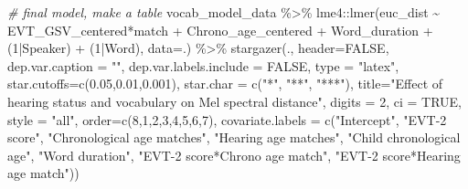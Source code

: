 \documentclass[
]{article}
\newenvironment{Shaded}{\begin{snugshade}}{\end{snugshade}}
\newcommand{\AttributeTok}[1]{\textcolor[rgb]{0.77,0.63,0.00}{#1}}
\newcommand{\CommentTok}[1]{\textcolor[rgb]{0.56,0.35,0.01}{\textit{#1}}}
\newcommand{\ConstantTok}[1]{\textcolor[rgb]{0.00,0.00,0.00}{#1}}
\newcommand{\DecValTok}[1]{\textcolor[rgb]{0.00,0.00,0.81}{#1}}
\newcommand{\FloatTok}[1]{\textcolor[rgb]{0.00,0.00,0.81}{#1}}
\newcommand{\FunctionTok}[1]{\textcolor[rgb]{0.00,0.00,0.00}{#1}}
\newcommand{\NormalTok}[1]{#1}
\newcommand{\SpecialCharTok}[1]{\textcolor[rgb]{0.00,0.00,0.00}{#1}}
\newcommand{\StringTok}[1]{\textcolor[rgb]{0.31,0.60,0.02}{#1}}
\begin{document}
\begin{Shaded}
\begin{Highlighting}[]
\CommentTok{\# final model, make a table}
\NormalTok{vocab\_model\_data }\SpecialCharTok{\%\textgreater{}\%}
\NormalTok{  lme4}\SpecialCharTok{::}\FunctionTok{lmer}\NormalTok{(euc\_dist }\SpecialCharTok{\textasciitilde{}}\NormalTok{ EVT\_GSV\_centered}\SpecialCharTok{*}\NormalTok{match }\SpecialCharTok{+}\NormalTok{ Chrono\_age\_centered }\SpecialCharTok{+}\NormalTok{ Word\_duration }\SpecialCharTok{+}\NormalTok{  (}\DecValTok{1}\SpecialCharTok{|}\NormalTok{Speaker) }\SpecialCharTok{+}\NormalTok{ (}\DecValTok{1}\SpecialCharTok{|}\NormalTok{Word), }\AttributeTok{data=}\NormalTok{.) }\SpecialCharTok{\%\textgreater{}\%}
  \FunctionTok{stargazer}\NormalTok{(., }\AttributeTok{header=}\ConstantTok{FALSE}\NormalTok{, }
            \AttributeTok{dep.var.caption =} \StringTok{""}\NormalTok{, }
            \AttributeTok{dep.var.labels.include =} \ConstantTok{FALSE}\NormalTok{,  }
            \AttributeTok{type =} \StringTok{"latex"}\NormalTok{,}
            \AttributeTok{star.cutoffs=}\FunctionTok{c}\NormalTok{(}\FloatTok{0.05}\NormalTok{,}\FloatTok{0.01}\NormalTok{,}\FloatTok{0.001}\NormalTok{), }
            \AttributeTok{star.char =} \FunctionTok{c}\NormalTok{(}\StringTok{"*"}\NormalTok{, }\StringTok{"**"}\NormalTok{, }\StringTok{"***"}\NormalTok{),}
            \AttributeTok{title=}\StringTok{"Effect of hearing status and vocabulary on Mel spectral distance"}\NormalTok{,  }
            \AttributeTok{digits =} \DecValTok{2}\NormalTok{, }
            \AttributeTok{ci =} \ConstantTok{TRUE}\NormalTok{, }
            \AttributeTok{style =} \StringTok{"all"}\NormalTok{,}
            \AttributeTok{order=}\FunctionTok{c}\NormalTok{(}\DecValTok{8}\NormalTok{,}\DecValTok{1}\NormalTok{,}\DecValTok{2}\NormalTok{,}\DecValTok{3}\NormalTok{,}\DecValTok{4}\NormalTok{,}\DecValTok{5}\NormalTok{,}\DecValTok{6}\NormalTok{,}\DecValTok{7}\NormalTok{),}
            \AttributeTok{covariate.labels =} \FunctionTok{c}\NormalTok{(}\StringTok{"Intercept"}\NormalTok{, }\StringTok{"EVT{-}2 score"}\NormalTok{, }\StringTok{"Chronological age matches"}\NormalTok{, }\StringTok{"Hearing age matches"}\NormalTok{, }\StringTok{"Child chronological age"}\NormalTok{, }\StringTok{"Word duration"}\NormalTok{,}
                                 \StringTok{"EVT{-}2 score*Chrono age match"}\NormalTok{, }\StringTok{"EVT{-}2 score*Hearing age match"}\NormalTok{))}
\end{Highlighting}
\end{Shaded}
\end{document}
